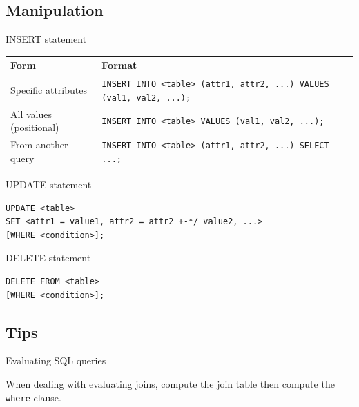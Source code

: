 \subsection{Manipulation}

\begin{definition}
    {INSERT statement}
    \begin{tabular}{|l|p{10cm}|}
        \hline
        \textbf{Form}           & \textbf{Format}                                                            \\ \hline
        Specific attributes     & \texttt{INSERT INTO <table> (attr1, attr2, ...) VALUES (val1, val2, ...);} \\
        All values (positional) & \texttt{INSERT INTO <table> VALUES (val1, val2, ...);}                     \\
        From another query      & \texttt{INSERT INTO <table> (attr1, attr2, ...) SELECT ...;}               \\ \hline
    \end{tabular}
\end{definition}

\begin{definition}
    {UPDATE statement}
    \begin{verbatim}
UPDATE <table>
SET <attr1 = value1, attr2 = attr2 +-*/ value2, ...>
[WHERE <condition>];
    \end{verbatim}
\end{definition}

\begin{definition}
    {DELETE statement}
    \begin{verbatim}
DELETE FROM <table>
[WHERE <condition>];
    \end{verbatim}
\end{definition}

\subsection{Tips}

\begin{knBox}
    {Evaluating SQL queries}

    When dealing with evaluating joins, compute the join table then compute the \texttt{where} clause.
\end{knBox}